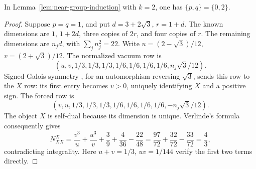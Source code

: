 \begin{lemma}
\label{lem:m6-balanced}
In Lemma~\ref{lem:near-group-induction} with $k=2$, one has
$\{p,q\}=\{0,2\}$.
\end{lemma}
\begin{proof}
Suppose $p=q=1$, and put $d=3+2\sqrt3$, $r=1+d$.
The known dimensions are $1$, $1+2d$, three copies of $2r$, and four
copies of $r$. The remaining dimensions are $n_jd$, with
$\sum_jn_j^2=22$. Write
$u=(2-\sqrt3)/12$, $v=(2+\sqrt3)/12$.
The normalized vacuum row is
\[
 (u,v,1/3,1/3,1/3,1/6,1/6,1/6,1/6,n_j\sqrt3/12).
\]
Signed Galois symmetry \cite[Theorem~II(iii)]{DLN}, for an
automorphism reversing $\sqrt3$, sends this row to the $X$ row:
its first entry becomes $v>0$, uniquely identifying $X$ and a
positive sign. The forced row is
\[
 (v,u,1/3,1/3,1/3,1/6,1/6,1/6,1/6,-n_j\sqrt3/12).
\]
The object $X$ is self-dual because its dimension is unique.
Verlinde's formula consequently gives
\[
 N_{XX}^{X}=\frac{v^3}{u}+\frac{u^3}{v}
              +\frac39+\frac4{36}-\frac{22}{48}
            =\frac{97}{72}+\frac{32}{72}-\frac{33}{72}
            =\frac43,
\]
contradicting integrality. Here $u+v=1/3$, $uv=1/144$ verify the
first two terms directly.
\end{proof}

